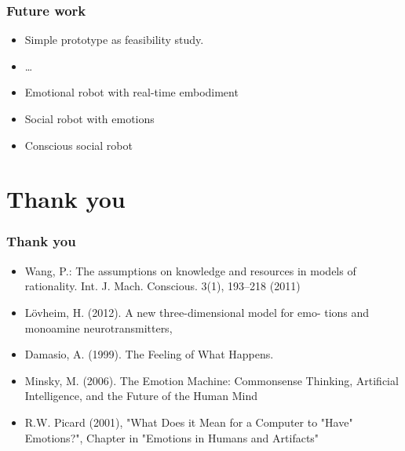\documentclass[12pt, aspectratio=169]{beamer}
\begin{document}

\begin{frame}
\frametitle{Future work}
\begin{itemize}
  \item Simple prototype as feasibility study.
  \item \ldots\
  \item Emotional robot with real-time embodiment
  \item Social robot with emotions
  \item Conscious social robot
\end{itemize}
\end{frame}


\section{Thank you}
\begin{frame}

\frametitle{Thank you}
\begin{itemize}
\item Wang, P.: The assumptions on knowledge and resources in models of rationality. Int. J. Mach. Conscious. 3(1), 193–218 (2011)
\item L\"{o}vheim, H. (2012). A new three-dimensional model for emo- tions and monoamine neurotransmitters,
\item Damasio, A. (1999). The Feeling of What Happens.
\item Minsky, M. (2006). The Emotion Machine: Commonsense Thinking, Artificial Intelligence, and the Future of the Human Mind
\item R.W. Picard (2001), "What Does it Mean for a Computer to "Have" Emotions?", Chapter in "Emotions in Humans and Artifacts" 
\end{itemize}


\end{frame}

\end{document}
